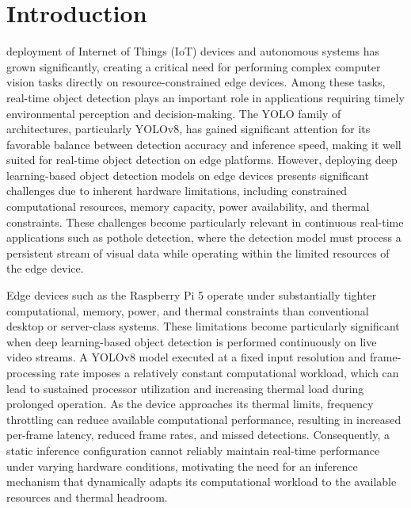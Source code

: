 \documentclass{ieeeaccess}
\begin{document}
\section{Introduction}
\label{sec:introduction}
 deployment of Internet of Things (IoT) devices and autonomous systems has grown significantly, creating a critical need for performing complex computer vision tasks directly on resource-constrained edge devices. Among these tasks, real-time object detection plays an important role in applications requiring timely environmental perception and decision-making. The YOLO family of architectures, particularly YOLOv8, has gained significant attention for its favorable balance between detection accuracy and inference speed, making it well suited for real-time object detection on edge platforms. However, deploying deep learning-based object detection models on edge devices presents significant challenges due to inherent hardware limitations, including constrained computational resources, memory capacity, power availability, and thermal constraints. These challenges become particularly relevant in continuous real-time applications such as pothole detection, where the detection model must process a persistent stream of visual data while operating within the limited resources of the edge device.

Edge devices such as the Raspberry Pi 5 operate under substantially tighter computational, memory, power, and thermal constraints than conventional desktop or server-class systems. These limitations become particularly significant when deep learning-based object detection is performed continuously on live video streams. A YOLOv8 model executed at a fixed input resolution and frame-processing rate imposes a relatively constant computational workload, which can lead to sustained processor utilization and increasing thermal load during prolonged operation. As the device approaches its thermal limits, frequency throttling can reduce available computational performance, resulting in increased per-frame latency, reduced frame rates, and missed detections. Consequently, a static inference configuration cannot reliably maintain real-time performance under varying hardware conditions, motivating the need for an inference mechanism that dynamically adapts its computational workload to the available resources and thermal headroom.
\end{document}
